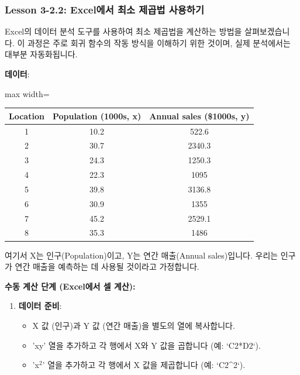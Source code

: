 \documentclass[11pt,a4paper]{article}
\begin{document}
\newpage
\subsubsection{Lesson 3-2.2: Excel에서 최소 제곱법 사용하기}

Excel의 데이터 분석 도구를 사용하여 최소 제곱법을 계산하는 방법을 살펴보겠습니다. 이 과정은 주로 회귀 함수의 작동 방식을 이해하기 위한 것이며, 실제 분석에서는 대부분 자동화됩니다.

\begin{tcolorbox}[examplebox, title=Excel 실습: 인구 및 매출 데이터]
\textbf{데이터}:
\begin{adjustbox}{max width=\textwidth}
\begin{tabular}{ccc}
\toprule
\textbf{Location} & \textbf{Population (1000s, x)} & \textbf{Annual sales (\$1000s, y)} \\
\midrule
1 & 10.2 & 522.6 \\
2 & 30.7 & 2340.3 \\
3 & 24.3 & 1250.3 \\
4 & 22.3 & 1095 \\
5 & 39.8 & 3136.8 \\
6 & 30.9 & 1355 \\
7 & 45.2 & 2529.1 \\
8 & 35.3 & 1486 \\
\bottomrule
\end{tabular}
\end{adjustbox}
여기서 X는 인구(Population)이고, Y는 연간 매출(Annual sales)입니다. 우리는 인구가 연간 매출을 예측하는 데 사용될 것이라고 가정합니다.

\textbf{수동 계산 단계 (Excel에서 셀 계산):}
\begin{enumerate}[label=\arabic*.]
    \item \textbf{데이터 준비}:
    \begin{itemize}
        \item X 값 (인구)과 Y 값 (연간 매출)을 별도의 열에 복사합니다.
        \item 'xy' 열을 추가하고 각 행에서 X와 Y 값을 곱합니다 (예: `C2*D2`).
        \item 'x$^2$' 열을 추가하고 각 행에서 X 값을 제곱합니다 (예: `C2^2`).
    \end{itemize}


\end{enumerate}
\end{tcolorbox}
\end{document}
